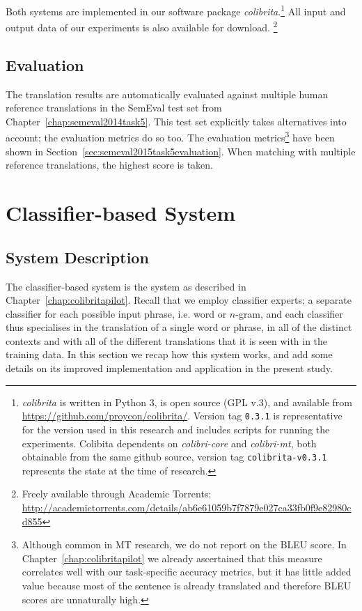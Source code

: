 Both systems are implemented in our software package
\emph{colibrita}.\footnote{\emph{colibrita} is written in Python 3, is open source
  (GPL v.3), and available from
  \url{https://github.com/proycon/colibrita/}. Version tag
  \texttt{0.3.1} is representative for the version used in this
  research and includes scripts for running the experiments.
  Colibita dependents on \emph{colibri-core} and \emph{colibri-mt}, both obtainable from the same github source, version tag \texttt{colibrita-v0.3.1} represents the state at
  the time of research.
  }
All input and output data of our experiments is also available for
download. \footnote{Freely available through Academic Torrents: \url{http://academictorrents.com/details/ab6e61059b7f7879e027ca33fb0f9e82980cd855} }

\subsection{Evaluation}

The translation results are automatically evaluated against multiple human
reference translations in the SemEval test set from
Chapter~\ref{chap:semeval2014task5}. This test set explicitly takes alternatives
into account; the evaluation metrics do so too. The evaluation
metrics\footnote{Although common in MT research, we do not report on the BLEU \citep{BLEU} score. In
Chapter~\ref{chap:colibritapilot} we already ascertained that this measure correlates well with
our task-specific accuracy metrics, but it has little added value because most of the sentence is already
translated and therefore BLEU scores are unnaturally high.} have been shown in
Section~\ref{sec:semeval2015task5evaluation}. When matching with multiple reference translations, the highest
score is taken.

\section{Classifier-based System}

\label{sec:classifierbased}

\subsection{System Description}

The classifier-based system is the system as described in
Chapter~\ref{chap:colibritapilot}. Recall that we employ classifier experts; a
separate classifier for each possible input phrase, i.e. word or $n$-gram, and
each classifier thus specialises in the translation of a single word or phrase,
in all of the distinct contexts and with all of the different translations that
it is seen with in the training data. In this section we recap how this system
works, and add some details on its improved implementation and application in
the present study.

